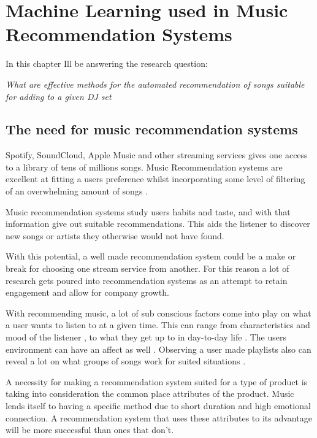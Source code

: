 
\graphicspath{{Chapter2/}}

\chapter{Machine Learning used in Music Recommendation Systems}

In this chapter Ill be answering the research question:

\textit{What are effective methods for the automated recommendation of songs suitable for adding to a given DJ set} 

\section{The need for music recommendation systems}
Spotify, SoundCloud, Apple Music and other streaming services gives one access to a library of tens of millions songs. Music Recommendation systems are excellent at fitting a users preference whilst incorporating some level of filtering of an overwhelming amount of songs \citep{bollen_understanding_2010}. 

Music recommendation systems study users habits and taste, and with that information give out suitable recommendations. This aids the listener to discover new songs or artists they otherwise would not have found.

With this potential, a well made recommendation system could be a make or break for choosing one stream service from another. For this reason a lot of research gets poured into recommendation systems as an attempt to retain engagement and allow for company growth. 

 With recommending music, a lot of sub conscious factors come into play on what a user wants to listen to at a given time. This can range from characteristics and mood of the listener \citep{ferwerda_personality_nodate}  \citep{rentfrow_re_2003}, to what they get up to in day-to-day life \citep{gillhofer_iron_2015} \citep{wang_context-aware_2012}.  The users environment can have an affect as well \citep{kaminskas_location-aware_2013}. Observing a user made playlists also can reveal a lot on what groups of songs work for suited situations \citep{zheleva_statistical_2010} \citep{mcfee_hypergraph_2012}.
 
 A necessity for making a recommendation system suited for a type of product is taking into consideration the common place attributes of the product. Music lends itself to having a specific method due to short duration and high emotional connection. A recommendation system that uses these attributes to its advantage will be more successful than ones that don't.

